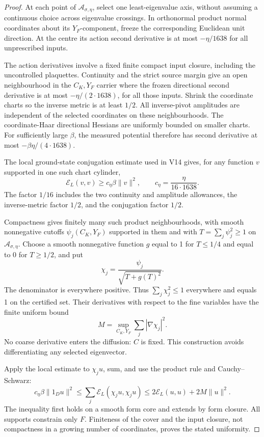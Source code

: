 \documentclass[11pt,oneside]{article}
\begin{document}
\begin{proof}
At each point of \(\mathcal A_{\sigma,\eta}\), select
one least-eigenvalue axis, without assuming a continuous
choice across eigenvalue crossings. In orthonormal
product normal coordinates about its \(Y_F\)-component,
freeze the corresponding Euclidean unit direction.
At the centre its action second derivative is at most
\(-\eta/1638\) for all unprescribed inputs.

The action derivatives involve a fixed finite compact
input closure, including the uncontrolled plaquettes.
Continuity and the strict source margin give an open
neighbourhood in the \(C_K,Y_F\) carrier where the
frozen directional second derivative is at most
\(-\eta/(2\cdot1638)\), for all those inputs.
Shrink the coordinate charts so the inverse metric is
at least \(1/2\). All inverse-pivot amplitudes are
independent of the selected coordinates on these
neighbourhoods. The coordinate-Haar directional
Hessians are uniformly bounded on smaller charts.
For sufficiently large \(\beta\), the measured
potential therefore has second derivative at most
\(-\beta\eta/(4\cdot1638)\).

The local ground-state conjugation estimate used
in V14 gives, for any function \(v\) supported in
one such chart cylinder,
\[
                   \mathcal E_L(v,v)
                              \ge c_\eta\beta\|v\|^2,
       \qquad c_\eta=\frac{\eta}{16\cdot1638}.
\]
The factor \(1/16\) includes the two continuity
and amplitude allowances, the inverse-metric factor
\(1/2\), and the conjugation factor \(1/2\).

Compactness gives finitely many such product
neighbourhoods, with smooth nonnegative cutoffs
\(\psi_j(C_K,Y_F)\) supported in them and with
\(T=\sum_j\psi_j^2\ge1\) on
\(\mathcal A_{\sigma,\eta}\). Choose a smooth
nonnegative function \(g\) equal to 1 for \(T\le1/4\)
and equal to 0 for \(T\ge1/2\), and put
\[
                  \chi_j=\frac{\psi_j}{\sqrt{T+g(T)^2}}.
\]
The denominator is everywhere positive. Thus
\(\sum_j\chi_j^2\le1\) everywhere and equals 1
on the certified set. Their derivatives with respect
to the fine variables have the finite uniform bound
\[
                        M=\sup_{C_K,Y_F}\sum_j|\nabla\chi_j|^2.
\]
No coarse derivative enters the diffusion: \(C\)
is fixed. This construction avoids differentiating
any selected eigenvector.

Apply the local estimate to \(\chi_j u\), sum,
and use the product rule and Cauchy--Schwarz:
\[
 c_\eta\beta\|1_Du\|^2
 \le\sum_j\mathcal E_L(\chi_j u,\chi_j u)
 \le2\mathcal E_L(u,u)+2M\|u\|^2.
\]
The inequality first holds on a smooth form core
and extends by form closure. All supports constrain
only \(F\). Finiteness of the cover and the input
closure, not compactness in a growing number of
coordinates, proves the stated uniformity.
\end{proof}
\end{document}
